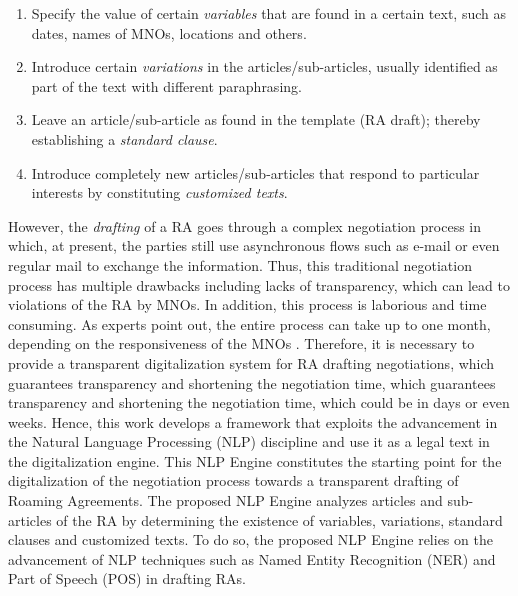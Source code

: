 \begin{enumerate}
\item Specify the value of certain \textit{variables} that are found in a certain text, such as dates, names of MNOs, locations and others.
\item Introduce certain \textit{variations} in the articles/sub-articles, usually identified as part of the text with different paraphrasing.
\item Leave an article/sub-article as found in the template (RA draft); thereby establishing a \textit{standard clause}.
\item Introduce completely new articles/sub-articles that respond to particular interests by constituting \textit{customized texts}.
\end{enumerate}

However, the \textit{drafting} of a RA goes through a complex negotiation process in which, at present, the parties still use asynchronous flows such as e-mail or even regular mail to exchange the information. Thus, this traditional negotiation process has multiple drawbacks including lacks of transparency, which can lead to violations of the RA by MNOs. In addition, this process is laborious and time consuming. As experts point out, the entire process can take up to one month, depending on the responsiveness of the MNOs \cite{ROCCO2017a}. Therefore, it is necessary to provide a transparent digitalization system for RA drafting negotiations, which guarantees transparency and shortening the negotiation time, which guarantees transparency and shortening the negotiation time, which could be in days or even weeks. Hence, this work develops a framework that exploits the advancement in the Natural Language Processing (NLP) discipline and use it as a legal text in the digitalization engine. This NLP Engine constitutes the starting point for the digitalization of the negotiation process towards a transparent drafting of Roaming Agreements. The proposed NLP Engine analyzes articles and sub-articles of the RA by determining the existence of variables, variations, standard clauses and customized texts. To do so, the proposed NLP Engine relies on the advancement of NLP techniques such as Named Entity Recognition (NER) and Part of Speech (POS) in drafting RAs.


